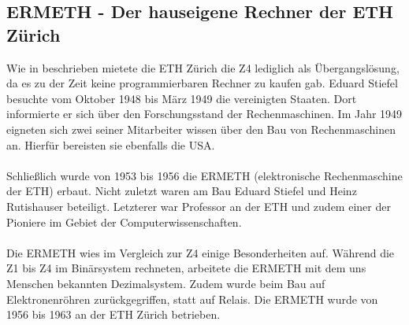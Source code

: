 \subsection{ERMETH - Der hauseigene Rechner der ETH Zürich}
Wie in \cite{bruderer2011konrad} beschrieben mietete die ETH Zürich die Z4 lediglich als Übergangslösung, da es zu der Zeit keine programmierbaren Rechner zu kaufen gab. Eduard Stiefel besuchte vom Oktober 1948 bis März 1949 die vereinigten Staaten. Dort informierte er sich über den Forschungsstand der Rechenmaschinen. Im Jahr 1949 eigneten sich zwei seiner Mitarbeiter wissen über den Bau von Rechenmaschinen an. Hierfür bereisten sie ebenfalls die USA.\\\\
Schließlich wurde von 1953 bis 1956 die ERMETH (elektronische Rechenmaschine der ETH) erbaut. Nicht zuletzt waren am Bau Eduard Stiefel und Heinz Rutishauser beteiligt. Letzterer war Professor an der ETH und zudem einer der Pioniere im Gebiet der Computerwissenschaften.\\\\
Die ERMETH wies im Vergleich zur Z4 einige Besonderheiten auf. Während die Z1 bis Z4 im Binärsystem rechneten, arbeitete die ERMETH mit dem uns Menschen bekannten Dezimalsystem. Zudem wurde beim Bau auf Elektronenröhren zurückgegriffen, statt auf Relais. Die ERMETH wurde von 1956 bis 1963 an der ETH Zürich betrieben.
